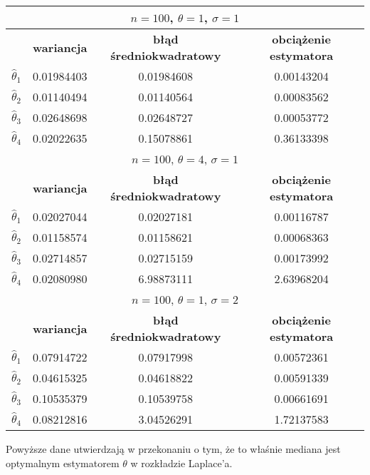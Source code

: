 \documentclass[a4paper]{article}
\begin{document}
\begin{table}[H]
\centering
\begin{tabular}{|c|c|c|c|}
\hline
\multicolumn{4}{|c|}{$n=100$, $\theta=1$, $\sigma=1$} \\ \hline
                  & \textbf{wariancja}   & \textbf{błąd średniokwadratowy} & \textbf{obciążenie estymatora} \\ \hline
$\hat{\theta}_1$ & 0.01984403 & 0.01984608 & 0.00143204 \\ \hline
$\hat{\theta}_2$ & 0.01140494 & 0.01140564 & 0.00083562 \\ \hline
$\hat{\theta}_3$ & 0.02648698 & 0.02648727 & 0.00053772 \\ \hline
$\hat{\theta}_4$ & 0.02022635 & 0.15078861 & 0.36133398 \\ \hline
\multicolumn{4}{|c|}{$n=100$, $\theta=4$, $\sigma=1$} \\ \hline
                  & \textbf{wariancja}   & \textbf{błąd średniokwadratowy} & \textbf{obciążenie estymatora} \\ \hline
$\hat{\theta}_1$ & 0.02027044 & 0.02027181 & 0.00116787 \\ \hline
$\hat{\theta}_2$ & 0.01158574 & 0.01158621 & 0.00068363 \\ \hline
$\hat{\theta}_3$ & 0.02714857 & 0.02715159 & 0.00173992 \\ \hline
$\hat{\theta}_4$ & 0.02080980 & 6.98873111 & 2.63968204 \\ \hline
\multicolumn{4}{|c|}{$n=100$, $\theta=1$, $\sigma=2$} \\ \hline
                  & \textbf{wariancja}   & \textbf{błąd średniokwadratowy} & \textbf{obciążenie estymatora} \\ \hline
$\hat{\theta}_1$ & 0.07914722 & 0.07917998 & 0.00572361 \\ \hline
$\hat{\theta}_2$ & 0.04615325 & 0.04618822 & 0.00591339 \\ \hline
$\hat{\theta}_3$ & 0.10535379 & 0.10539758 & 0.00661691 \\ \hline
$\hat{\theta}_4$ & 0.08212816 & 3.04526291 & 1.72137583 \\ \hline
\end{tabular}
\end{table}

Powyższe dane utwierdzają w przekonaniu o tym, że to właśnie mediana jest optymalnym estymatorem $\theta$ w rozkładzie Laplace'a.
\end{document}
